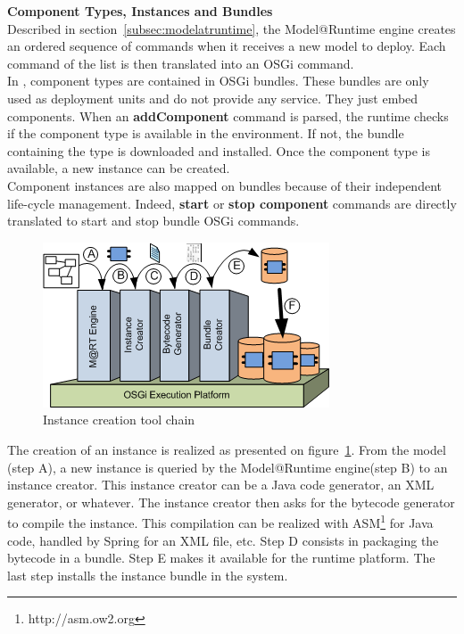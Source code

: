 \vspace{0.5cm}
{\bf Component Types, Instances and Bundles}\\
Described in section~\ref{subsec:modelatruntime}, the Model@Runtime engine creates an ordered sequence of commands when it receives a new model to deploy. Each command of the list is then translated into an OSGi command.\\
In \enti{}, component types are contained in OSGi bundles. These bundles are only used as deployment units and do not provide any service. They just embed components. When an {\bf addComponent} command is parsed, the runtime checks if the component type is available in the environment. If not, the bundle containing the type is downloaded and installed. Once the component type is available, a new instance can be created.\\
Component instances are also mapped on bundles because of their independent life-cycle management. Indeed, {\bf start} or {\bf stop component} commands are directly translated to start and stop bundle OSGi commands.\\
\begin{figure}[h!]
\centering
  \includegraphics[width=.6\textwidth]{part2/pics/toolchain3.png}
  \caption{Instance creation tool chain}
  \label{fig:instanceToolChain}
\end{figure}

The creation of an instance is realized as presented on figure~\ref{fig:instanceToolChain}. From the model (step A), a new instance is queried by the Model@Runtime engine(step B) to an instance creator. This instance creator can be a Java code generator, an XML generator, or whatever. The instance creator then asks for the bytecode generator to compile the instance. This compilation can be realized with ASM\footnote{http://asm.ow2.org} for Java code, handled by Spring for an XML file, etc. Step D consists in packaging the bytecode in a bundle. Step E makes it available for the runtime platform. The last step installs the instance bundle in the system.\\

